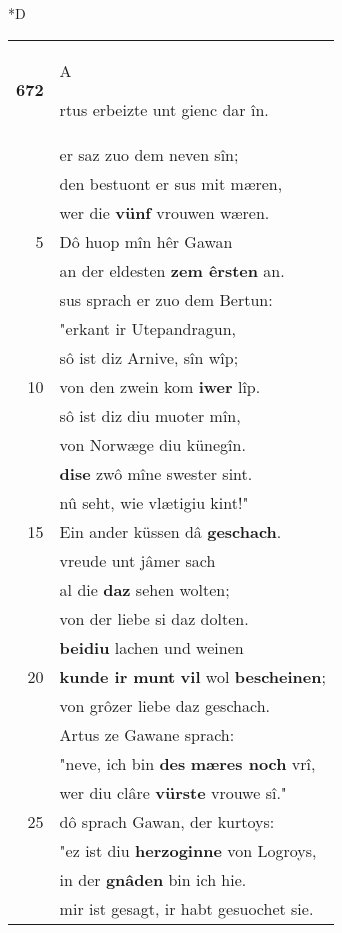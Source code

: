 \documentclass[8pt,a4paper,notitlepage]{article}
\begin{document}
\begin{table}[ht]
\begin{minipage}[t]{0.5\linewidth}
\small
\begin{center}*D
\end{center}
\begin{tabular}{rl}
\textbf{672} & \begin{large}A\end{large}rtus erbeizte unt gienc dar în.\\ 
 & er saz zuo dem neven sîn;\\ 
 & den bestuont er sus mit mæren,\\ 
 & wer die \textbf{vünf} vrouwen wæren.\\ 
5 & Dô huop mîn hêr Gawan\\ 
 & an der eldesten \textbf{zem êrsten} an.\\ 
 & sus sprach er zuo dem Bertun:\\ 
 & "erkant ir Utepandragun,\\ 
 & sô ist diz Arnive, sîn wîp;\\ 
10 & von den zwein kom \textbf{iwer} lîp.\\ 
 & sô ist diz diu muoter mîn,\\ 
 & von Norwæge diu künegîn.\\ 
 & \textbf{dise} zwô mîne swester sint.\\ 
 & nû seht, wie vlætigiu kint!"\\ 
15 & Ein ander küssen dâ \textbf{geschach}.\\ 
 & vreude unt jâmer sach\\ 
 & al die \textbf{daz} sehen wolten;\\ 
 & von der liebe si daz dolten.\\ 
 & \textbf{beidiu} lachen und weinen\\ 
20 & \textbf{kunde ir munt} \textbf{vil} wol \textbf{bescheinen};\\ 
 & von grôzer liebe daz geschach.\\ 
 & Artus ze Gawane sprach:\\ 
 & "neve, ich bin \textbf{des} \textbf{mæres noch} vrî,\\ 
 & wer diu clâre \textbf{vürste} vrouwe sî."\\ 
25 & dô sprach Gawan, der kurtoys:\\ 
 & "ez ist diu \textbf{herzoginne} von Logroys,\\ 
 & in der \textbf{gnâden} bin ich hie.\\ 
 & mir ist gesagt, ir habt gesuochet sie.\\ 

\end{tabular}
\end{minipage}
\end{table}
\end{document}
